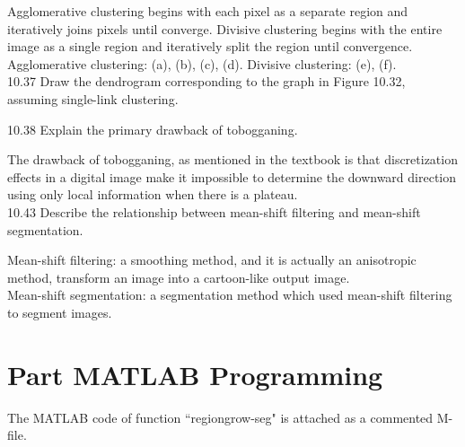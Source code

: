 \documentclass[a4paper]{article}
\begin{document}
\begin{spacing}{2.0}
	Agglomerative clustering begins with each pixel as a separate region and iteratively joins pixels until converge. Divisive clustering begins with the entire image as a single region and iteratively split the region until convergence.\\
	Agglomerative clustering: (a), (b), (c), (d).
	Divisive clustering: (e), (f).\\
	
	10.37 Draw the dendrogram corresponding to the graph in Figure 10.32, assuming single-link clustering.
	
	10.38 Explain the primary drawback of tobogganing.
	
	The drawback of tobogganing, as mentioned in the textbook is that discretization effects in a digital image make it impossible to determine the downward direction using only local information when there is a plateau.\\
	
	10.43 Describe the relationship between mean-shift filtering and mean-shift segmentation.
	
	Mean-shift filtering: a smoothing method, and it is actually an anisotropic method, transform an image into a cartoon-like output image.\\
	Mean-shift segmentation: a segmentation method which used mean-shift filtering to segment images.
	
	
\newpage	
\section*{\huge\textbf{ Part \uppercase\expandafter{} MATLAB Programming}  }
	\normalsize			
	The MATLAB code of function ``regiongrow-seg" is attached as a commented M-file.
	
\end{spacing}
\end{document}
